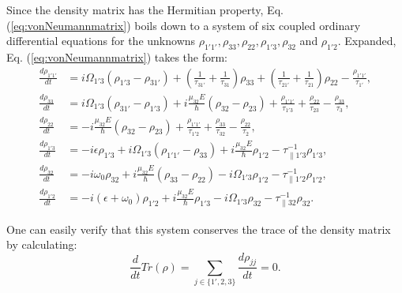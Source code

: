 \documentclass[10pt,letterpaper]{article}
\begin{document}
Since the density matrix has the Hermitian property, Eq. (\ref{eq:vonNeumannmatrix}) boils down to a system of six coupled ordinary differential equations for the unknowns $\rho_{1'1'}, \rho_{33},\rho_{22},\rho_{1'3},\rho_{32} $ and $\rho_{1'2}$. Expanded, Eq. (\ref{eq:vonNeumannmatrix}) takes the form:
\begin{subequations}
	\label{subeq:DM}
\begin{align}
\frac{d \rho_{1'1'}}{d t} &= i\Omega_{1'3} (\rho_{1'3} - \rho_{31'}) + (\frac{1}{\tau_{31'}}  + \frac{1}{\tau_{31}})\rho_{33} + (\frac{1}{\tau_{21'}}   +\frac{1}{\tau_{21}})\rho_{22} - \frac{\rho_{1'1'}}{\tau_{1'}} ,  \label{eq:vonNeumannexpandedstart}\\ 
\frac{d \rho_{33}}{d t}   &= i\Omega_{1'3} (\rho_{31'} - \rho_{1'3}) + i\frac{\mu_{32} E}{\hbar} (\rho_{32}-\rho_{23}) + \frac{ \rho_{1'1'}}{\tau_{1'3}} +
 \frac{\rho_{22}}{\tau_{23}} - \frac{\rho_{33}}{\tau_{3}},  \\
\frac{d \rho_{22}}{d t}   &=- i\frac{\mu_{32} E}{\hbar} (\rho_{32}-\rho_{23}) +\frac{\rho_{1'1'}}{\tau_{1'2}}  + \frac{\rho_{33}}{\tau_{32}} - \frac{\rho_{22}}{\tau_{2}} , \\
\frac{d \rho_{1'3}}{d t}  &= -i\epsilon\rho_{1'3} +i \Omega_{1'3}(\rho_{1'1'} - \rho_{33}) +i\frac{\mu_{32}E}{\hbar}\rho_{1'2} -\tau_{\parallel 1'3}^{-1}\rho_{1'3}, \\
\frac{d \rho_{32}}{d t}   &= -i\omega_{0}\rho_{32} +i \frac{\mu_{32}E}{\hbar}(\rho_{33}-\rho_{22}) -i\Omega_{1'3}\rho_{1'2} -\tau_{\parallel 1'2}^{-1}\rho_{1'2},   \\
\frac{d \rho_{1'2}}{d t}  &= -i(\epsilon+\omega_0)\rho_{1'2} +i\frac{\mu_{32}E}{\hbar}\rho_{1'3} -i\Omega_{1'3}\rho_{32} -\tau_{\parallel 32}^{-1}\rho_{32} . \label{eq:vonNeumannexpandedend}
\end{align}
\end{subequations}

One can easily verify that this system conserves the trace of the density matrix by calculating:
$$
\frac{d }{dt}Tr(\rho) = \sum_{j\in \{1',2,3\}} \frac{d \rho_{jj}}{dt} = 0.
$$
\end{document}
